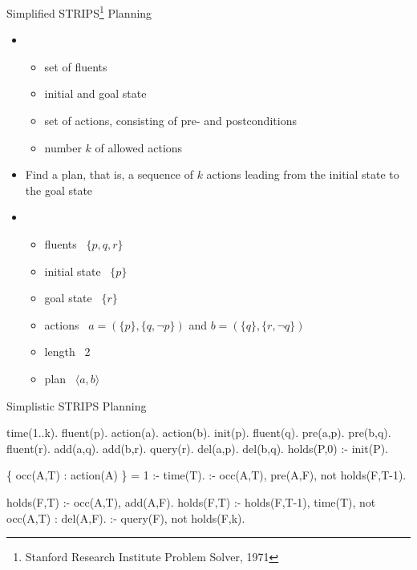 \begin{frame}{Simplified STRIPS\footnote{Stanford Research Institute Problem Solver, 1971} Planning}

  \begin{itemize}
  \item<2-> 
    \begin{itemize}
    \item set of fluents
    \item initial and goal state
    \item set of actions, consisting of pre- and postconditions
    \item number $k$ of allowed actions
    \end{itemize}
  \item<2-> 
    Find a plan, that is, a sequence of $k$ actions leading from the initial state to the goal state
    \smallskip
  \item<3-> 
    \begin{itemize}
    \item fluents       \ $\{p,q,r\}$
    \item initial state \ $\{p\}$
    \item goal state    \ $\{r\}$
    \item actions       \ $a = (\{p\},\{q,\neg p\})$ and $b = (\{q\},\{r,\neg q\})$
    \item length        \ 2
      \medskip
    \item<4-> plan      \ $\langle a, b \rangle$
    \end{itemize}
    \medskip
  \end{itemize}

\end{frame}
\begin{frame}[fragile,shrink=1]{Simplistic STRIPS Planning}
\begin{semiverbatim}
time(1..k).
\pause
fluent(p).     action(a).     action(b).       init(p).
fluent(q).        pre(a,p).      pre(b,q).
fluent(r).        add(a,q).      add(b,r).     query(r).
                  del(a,p).      del(b,q).
\pause
holds(P,0) :- init(P).

\{ occ(A,T) : action(A) \} = 1 :- time(T).
:- occ(A,T), pre(A,F), not holds(F,T-1).

holds(F,T) :- occ(A,T), add(A,F).
holds(F,T) :- holds(F,T-1), time(T), not occ(A,T) : del(A,F).
\pause
:- query(F), not holds(F,k).
\end{semiverbatim}
\end{frame}
%
